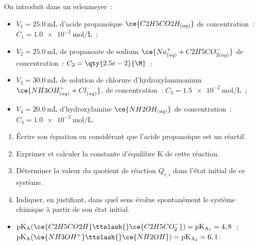 On introduit dans un erlenmeyer~:
\begin{itemize}
    \item $V_1=\qty{25.0}{\mL}$ d'acide propanoïque $\ce{C2H5CO2H_{(aq)}}$ de
          concentration~: ${C_1=\qty{1.0e-2}{\mol\per\L}}$~;
    \item \raggedright $V_2=\qty{25.0}{\mL}$ de propanoate de sodium
          ${\ce{Na^{+}_{(aq)} + C2H5CO^{-}_{2(aq)}}}$ de concentration~:
          ${C_2=\qty{2.5e-2}{\M}}$~;
    \item $V_3=\qty{30.0}{\mL}$ de solution de chlorure d'hydroxylammonium
          $\ce{NH3OH^{+}_{(aq)} + Cl^{-}_{(aq)}}$, de
          concentration~: $C_3=\qty{1.5e-2}{\mol\per\L}$~; 
    \item $V_4=\qty{20.0}{\mL}$ d'hydroxylamine $\ce{NH2OH_{(aq)}}$ de
          concentration~: $C_4=\qty{1.0e-2}{\mol\per\L}$.
\end{itemize}
\begin{enumerate}
    \item Écrire son équation en considérant que l'acide propanoïque est un
          réactif.
    \item Exprimer et calculer la constante d'équilibre $\mathrm{K}$ de cette
          réaction.
    \item Déterminer la valeur du quotient de réaction $Q_{r,i}$ dans l'état
          initial de ce système.
    \item Indiquer, en justifiant, dans quel sens évolue spontanément le système
          chimique à partir de son état initial.
\end{enumerate}

\begin{donnees}
    \begin{itemize}
        \item $\mathrm{pK_{A}}(\ce{C2H5CO2H}\ttslash{}\ce{C2H5CO^-_2})=
              \mathrm{pK_{A_1}}=4,8$~; \
              $\mathrm{pK_{A}}(\ce{NH3OH^{+}}\ttslash{}\ce{NH2OH})=
              \mathrm{pK_{A_2}}=6,1$.
    \end{itemize}
\end{donnees}
